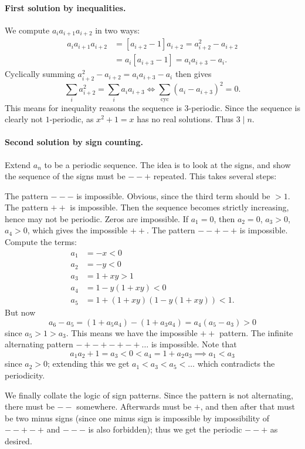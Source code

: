 \documentclass[11pt]{scrartcl}
\begin{document}
\paragraph{First solution by inequalities.}
We compute $a_i a_{i+1} a_{i+2}$ in two ways:
\begin{align*}
  a_i a_{i+1} a_{i+2} &= [a_{i+2}-1]a_{i+2} = a_{i+2}^2 - a_{i+2} \\
  &= a_i [a_{i+3}-1] = a_i a_{i+3} - a_i.
\end{align*}
Cyclically summing $a_{i+2}^2 - a_{i+2} = a_i a_{i+3} - a_i$ then gives
\[ \sum_i a_{i+2}^2 = \sum_i a_i a_{i+3}
  \iff \sum_{\text{cyc}} \left( a_i - a_{i+3} \right)^2 = 0.  \]
This means for inequality reasons the sequence is $3$-periodic.
Since the sequence is clearly not $1$-periodic,
as $x^2 + 1 = x$ has no real solutions.
Thus $3 \mid n$.

\paragraph{Second solution by sign counting.}
Extend $a_n$ to be a periodic sequence.
The idea is to look at the signs, and show the sequence
of the signs must be $--+$ repeated.
This takes several steps:
\begin{itemize}
  \ii The pattern $---$ is impossible. Obvious, since the third term should be $ > 1$.
  \ii The pattern $++$ is impossible. Then the sequence becomes strictly increasing,
  hence may not be periodic.
  \ii Zeros are impossible. If $a_1 = 0$, then $a_2 = 0$, $a_3 > 0$, $a_4 > 0$,
  which gives the impossible $++$.
  \ii The pattern $--+-+$ is impossible.
  Compute the terms:
  \begin{align*}
    a_1 &= -x < 0 \\
    a_2 &= -y < 0 \\
    a_3 &= 1 + xy > 1 \\
    a_4 &= 1 - y(1+xy) < 0 \\
    a_5 &= 1 + (1+xy)(1-y(1+xy)) < 1.
  \end{align*}
  But now
  \[ a_6 - a_5 = (1 + a_5 a_4) - (1 + a_3 a_4)
    = a_4 (a_5 - a_3) > 0 \]
  since $a_5 > 1 > a_3$.
  This means we have the impossible $++$ pattern.
  \ii The infinite alternating pattern $-+-+-+-+\dots$ is impossible.
  Note that
  \[ a_1 a_2 + 1 = a_3 < 0 < a_4 = 1 + a_2 a_3 \implies a_1 < a_3 \]
  since $a_2 > 0$;
  extending this we get $a_1 < a_3 < a_5 < \dots$
  which contradicts the periodicity.
\end{itemize}
We finally collate the logic of sign patterns.
Since the pattern is not alternating, there must be $--$ somewhere.
Afterwards must be $+$, and then after that must be two minus signs
(since one minus sign is impossible by impossibility of $--+-+$
and $---$ is also forbidden);
thus we get the periodic $--+$ as desired.
\pagebreak
\end{document}
